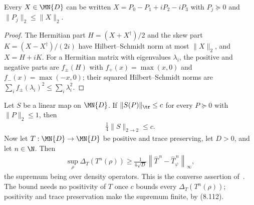 \begin{lemma}
    \label{lem:four_posSemidef_frobenius}
    \leanok
    Every $X\in\MN{D}$ can be written $X=P_0-P_1+iP_2-iP_3$ with
    $P_j\succeq0$ and $\lVert P_j\rVert_2\leq\lVert X\rVert_2$.
\end{lemma}

\begin{proof}\leanok
    The Hermitian part $H=(X+X^\dagger)/2$ and the skew part
    $K=(X-X^\dagger)/(2i)$ have Hilbert--Schmidt norm at most
    $\lVert X\rVert_2$, and $X=H+iK$. For a Hermitian matrix with eigenvalues
    $\lambda_i$, the positive and negative parts are $f_\pm(H)$ with
    $f_+(x)=\max(x,0)$ and $f_-(x)=\max(-x,0)$; their squared
    Hilbert--Schmidt norms are $\sum_if_\pm(\lambda_i)^2\leq\sum_i\lambda_i^2$.
\end{proof}

\begin{theorem}
    \label{thm:trace_norm_asymptotic_distance_lower}
    \leanok
    Let $S$ be a linear map on $\MN{D}$. If $\lVert S(P)\rVert_{\tr}\leq c$
    for every $P\succeq0$ with $\lVert P\rVert_2\leq1$, then
    \begin{align}
        \tfrac14\lVert S\rVert_{2\to2}\leq c.
        \tag{8.117}
    \end{align}
    Now let $T:\MN{D}\to\MN{D}$ be positive and trace preserving, let $D>0$,
    and let $n\in\N$. Then
    \begin{align}
        \sup_\rho\Delta_T(T^n(\rho))
        \geq\frac1{4\sqrt D}
        \left\lVert \widehat T^{\,n}-\widehat T_\varphi^{\,n}\right\rVert_\infty,
        \tag{8.113}
    \end{align}
    the supremum being over density operators. This is the converse assertion
    of~\cite[Chapter~8, Proposition ``Convergence towards asymptotic states'',
        Eqs.~(8.113), (8.117)]{Wolf2012Quantum}. The bound needs no positivity
    of $T$ once $c$ bounds every $\Delta_T(T^n(\rho))$; positivity and trace
    preservation make the supremum finite, by (8.112).
\end{theorem}

